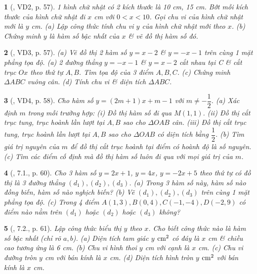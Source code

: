 \documentclass{article}
\newtheorem{baitoan}{}
\begin{document}
\begin{baitoan}[\cite{Binh_boi_duong_Toan_9_tap_1}, VD2, p. 57]
	1 hình chữ nhật có 2 kích thước là {\rm10 cm, 15 cm}. Bớt mỗi kích thước của hình chữ nhật đi $x$ {\rm cm} với $0 < x < 10$. Gọi chu vi của hình chữ nhật mới là $y$ {\rm cm}. (a) Lập công thức tính chu vi $y$ của hình chữ nhật mới theo $x$. (b) Chứng minh $y$ là hàm số bậc nhất của $x$ \& vẽ đồ thị hàm số đó.
\end{baitoan}

\begin{baitoan}[\cite{Binh_boi_duong_Toan_9_tap_1}, VD3, p. 57]
	(a) Vẽ đồ thị 2 hàm số $y = x - 2$ \& $y = -x - 1$ trên cùng 1 mặt phẳng tọa độ. (a) 2 đường thẳng $y = -x - 1$ \& $y = x - 2$ cắt nhau tại C \& cắt trục $Ox$ theo thứ tự $A,B$. Tìm tọa độ của 3 điểm $A,B,C$. (c) Chứng minh $\Delta ABC$ vuông cân. (d) Tính chu vi \& diện tích $\Delta ABC$.
\end{baitoan}

\begin{baitoan}[\cite{Binh_boi_duong_Toan_9_tap_1}, VD4, p. 58]
	Cho hàm số $y = (2m + 1)x + m - 1$ với $m\ne-\dfrac{1}{2}$. (a) Xác định $m$ trong mỗi trường hợp: (i) Đồ thị hàm số đi qua $M(1,1)$. (ii) Đồ thị cắt trục tung, trục hoành lần lượt tại $A,B$ sao cho $\Delta OAB$ cân. (iii) Đồ thị cắt trục tung, trục hoành lần lượt tại $A,B$ sao cho $\Delta OAB$ có diện tích bằng $\dfrac{1}{2}$. (b) Tìm giá trị nguyên của $m$ để đồ thị cắt trục hoành tại điểm có hoành độ là số nguyên. (c) Tìm các điểm cố định mà đồ thị hàm số luôn đi qua với mọi giá trị của $m$.
\end{baitoan}

\begin{baitoan}[\cite{Binh_boi_duong_Toan_9_tap_1}, 7.1., p. 60]
	Cho 3 hàm số $y = 2x + 1$, $y = 4x$, $y = -2x + 5$ theo thứ tự có đồ thị là 3 đường thẳng $(d_1),(d_2),(d_3)$. (a) Trong 3 hàm số này, hàm số nào đồng biến, hàm số nào nghịch biến? (b) Vẽ $(d_1),(d_2),(d_3)$ trên cùng 1 mặt phẳng tọa độ. (c) Trong 4 điểm $A(1,3),B(0,4),C(-1,-4),D(-2,9)$ có điểm nào nằm trên $(d_1)$ hoặc $(d_2)$ hoặc $(d_3)$ không?
\end{baitoan}

\begin{baitoan}[\cite{Binh_boi_duong_Toan_9_tap_1}, 7.2., p. 61]
	Lập công thức biểu thị $y$ theo $x$. Cho biết công thức nào là hàm số bậc nhất (chỉ rõ $a,b$). (a) Diện tích tam giác $y$ $\rm cm^2$ có đáy là $x$ {\rm cm} \& chiều cao tương ứng là {\rm6 cm}. (b) Chu vi hình thoi $y$ {\rm cm} với cạnh là $x$ {\rm cm}. (c) Chu vi đường tròn $y$ {\rm cm} với bán kính là $x$ {\rm cm}. (d) Diện tích hình tròn $y$ $\rm cm^2$ với bán kính là $x$ {\rm cm}.
\end{baitoan}
\end{document}
